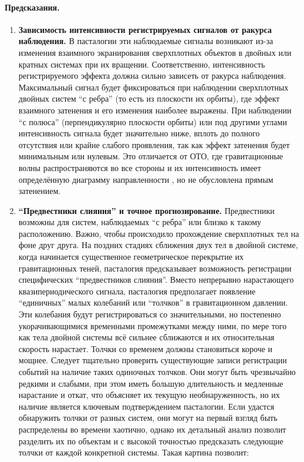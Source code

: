 \documentclass[pdflatex,sn-mathphys-num]{sn-jnl}
\begin{document}
\paragraph{Предсказания.}
\begin{enumerate}
    \item \textbf{Зависимость интенсивности регистрируемых сигналов от ракурса наблюдения.} В пасталогии эти наблюдаемые сигналы возникают из-за изменения взаимного экранирования сверхплотных объектов в двойных или кратных системах при их вращении. Соответственно, интенсивность регистрируемого эффекта должна сильно зависеть от ракурса наблюдения. Максимальный сигнал будет фиксироваться при наблюдении сверхплотных двойных систем ``с ребра'' (то есть из плоскости их орбиты), где эффект взаимного затенения и его изменения наиболее выражены. При наблюдении ``с полюса'' (перпендикулярно плоскости орбиты) или под другими углами интенсивность сигнала будет значительно ниже, вплоть до полного отсутствия или крайне слабого проявления, так как эффект затенения будет минимальным или нулевым. Это отличается от ОТО, где гравитационные волны распространяются во все стороны и их интенсивность имеет определённую диаграмму направленности \cite{maggiore2007-gw}, но не обусловлена прямым затенением.
    \item \textbf{``Предвестники слияния'' и точное прогнозирование.} Предвестники возможны для систем, наблюдаемых ``с ребра'' или близко к такому расположению. Важно, чтобы происходило прохождение сверхплотных тел на фоне друг друга. На поздних стадиях сближения двух тел в двойной системе, когда начинается существенное геометрическое перекрытие их гравитационных теней, пасталогия предсказывает возможность регистрации специфических ``предвестников слияния''. Вместо непрерывно нарастающего квазипериодического сигнала, пасталогия предполагает появление ``единичных'' малых колебаний или ``толчков'' в гравитационном давлении. Эти колебания будут регистрироваться со значительными, но постепенно укорачивающимися временными промежутками между ними, по мере того как тела двойной системы всё сильнее сближаются и их относительная скорость нарастает. Толчки со временем должны становиться короче и мощнее. Следует тщательно проверить существующие записи регистрации событий на наличие таких одиночных толчков. Они могут быть чрезвычайно редкими и слабыми, при этом иметь большую длительность и медленные нарастание и откат, что объясняет их текущую необнаруженность, но их наличие является ключевым подтверждением пасталогии. Если удастся обнаружить толчки от разных систем, они могут на первый взгляд быть распределены во времени хаотично, однако их детальный анализ позволит разделить их по объектам и с высокой точностью предсказать следующие толчки от каждой конкретной системы. Такая картина позволит:

\end{enumerate}
\end{document}
